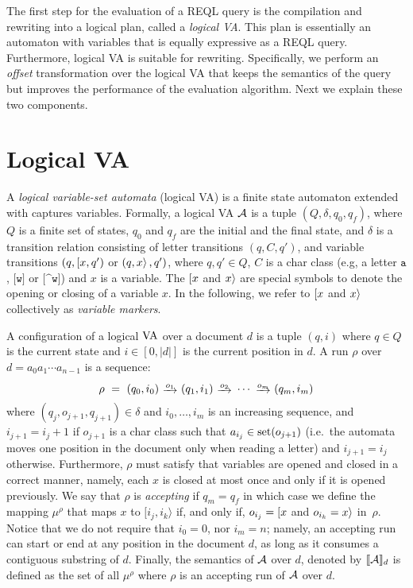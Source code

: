 
The first step for the evaluation of a REQL query is the compilation and
rewriting into a logical plan, called a \emph{logical VA}. This plan is
essentially an automaton with variables that is equally expressive as a REQL
query. Furthermore, logical VA is suitable for rewriting. Specifically, we
perform an \emph{offset} transformation over the logical VA that keeps the
semantics of the query but improves the performance of the evaluation algorithm.
Next we explain these two components. %

\section{Logical VA}

A \emph{logical variable-set automata} (logical VA) is a finite state automaton
extended with captures variables. %
Formally, a logical VA $\mathcal{A}$ is a tuple $(Q, \delta, q_0, q_f)$, where $Q$ is a
finite set of states, $q_0$ and $q_f$ are the initial and the final state, and
$\delta$ is a transition relation consisting of letter transitions $(q, C, q')$,
and variable transitions $(q, [ x, q')$ or $(q, x \rangle\,,q')$, where $q,
q' \in Q$, $C$ is a char class (e.g, a letter $\texttt{a}$, $\texttt{[w]}$ or
$\texttt{[\textasciicircum w]}$) and $x$ is a variable. The $[ x$ and
$x \rangle$ are special symbols to denote the opening or closing of a variable
$x$. In the following, we refer to $[ x$ and $x \rangle$ collectively as
\emph{variable markers}.

A configuration of a logical $\mathrm{VA}$ over a document $d$ is a tuple $(q, i)$ where
$q \in Q$ is the current state and \(i \in [0, |d|]\) is the current position in
$d$. A run $\rho$ over $d = a_0 a_1 \cdots a_{n-1}$ is a sequence:
$$
	\rho \ = \ (q_0, i_0) \ \trans{o_1} \ (q_1, i_1) \ \trans{o_2} \ \cdots \ \trans{o_m} \ (q_m, i_m)
$$
where $(q_j, o_{j+1}, q_{j+1}) \in \delta$ and $i_0, \ldots, i_m$ is an
increasing sequence, and $i_{j+1} = i_j +1$ if $o_{j+1}$ is a char class such
that $a_{i_j} \in \operatorname{set}(o_{j+1})$   (i.e.\ the automata moves one position in
the document only when reading a letter) and $i_{j+1} = i_j$ otherwise.
Furthermore, $\rho$ must satisfy that variables are opened and closed in a
correct manner, namely, each $x$ is closed at most once and only if it is opened
previously. We say that $\rho$ is \emph{accepting} if $q_m = q_f$ in which case
we define the mapping $\mu^{\rho}$ that maps $x$ to $[i_j, i_k\rangle$ if, and
only if, $o_{i_j} = [ x$ and $o_{i_k} = x \rangle$ in~$\rho$. Notice that
we do not require that $i_0 = 0$, nor $i_m=n$; namely, an accepting run can
start or end at any position in the document $d$, as long as it consumes a
contiguous substring of $d$. Finally, the semantics of $\mathcal{A}$ over $d$, denoted
by \(\llbracket\mathcal{A}\rrbracket_{d}\) is defined as the set of all $\mu^{\rho}$ where $\rho$ is an
accepting run of $\mathcal{A}$ over $d$.

